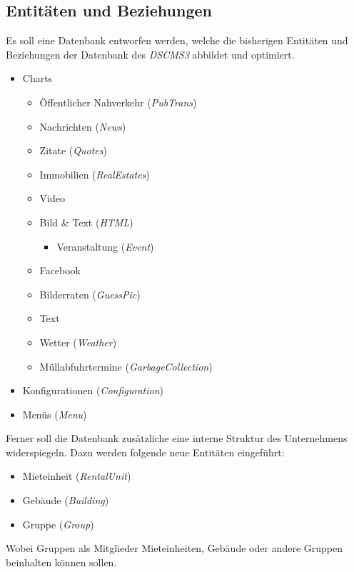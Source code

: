 \documentclass[a4paper]{article}
\begin{document}
	\subsection{Entitäten und Beziehungen}
	Es soll eine Datenbank entworfen werden, welche die bisherigen Entitäten und Beziehungen der Datenbank des \emph{DSCMS3} abbildet und optimiert.
	\begin{itemize}
		\item Charts
		\begin{itemize}
			\item Öffentlicher Nahverkehr (\emph{PubTrans})
			\item Nachrichten (\emph{News})
			\item Zitate (\emph{Quotes})
			\item Immobilien (\emph{RealEstates})
			\item Video
			\item Bild \& Text (\emph{HTML})
				\begin{itemize}
					\item Veranstaltung (\emph{Event})
				\end{itemize}
			\item Facebook
			\item Bilderraten (\emph{GuessPic})
			\item Text
			\item Wetter (\emph{Weather})
			\item Müllabfuhrtermine (\emph{GarbageCollection})
		\end{itemize}
		\item Konfigurationen (\emph{Configuration})
		\item Menüs (\emph{Menu})
	\end{itemize}
	Ferner soll die Datenbank zusätzliche eine interne Struktur des Unternehmens widerspiegeln. Dazu werden folgende neue Entitäten eingeführt:
	\begin{itemize}
		\item Mieteinheit (\emph{RentalUnit})
		\item Gebäude (\emph{Building})
		\item Gruppe (\emph{Group})
	\end{itemize}
	Wobei Gruppen als Mitglieder Mieteinheiten, Gebäude oder andere Gruppen beinhalten können sollen.
	\pagebreak
\end{document}
